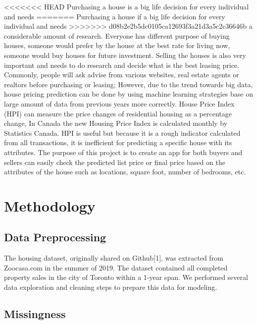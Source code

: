 \documentclass[11pt,]{article}
\begin{document}
<<<<<<< HEAD
Purchasing a house is a big life decision for every individual and needs
=======
Purchasing a house if a big life decision for every individual and needs
>>>>>>> d08b2e2b5dc0105ca12693f3a21d3a5c2c36646b
a considerable amount of research. Everyone has different purpose of
buying houses, someone would prefer by the house at the best rate for
living now, someone would buy houses for future investment. Selling the
houses is also very important and needs to do research and decide what
is the best leasing price. Commonly, people will ask advise from various
websites, real estate agents or realtors before purchasing or leasing;
However, due to the trend towards big data, house pricing prediction can
be done by using machine learning strategies base on large amount of
data from previous years more correctly. House Price Index (HPI) can
measure the price changes of residential housing as a percentage change,
In Canada the new Housing Price Index is calculated monthly by
Statistics Canada. HPI is useful but because it is a rough indicator
calculated from all transactions, it is inefficient for predicting a
specific house with its attributes. The purpose of this project is to
create an app for both buyers and sellers can easily check the predicted
list price or final price based on the attributes of the house such as
locations, square foot, number of bedrooms, etc.

\hypertarget{methodology}{%
\section{Methodology}\label{methodology}}

\hypertarget{data-preprocessing}{%
\subsection{Data Preprocessing}\label{data-preprocessing}}

The housing dataset, originally shared on Github{[}1{]}, was extracted
from Zoocasa.com in the summer of 2019. The dataset contained all
completed property sales in the city of Toronto within a 1-year span. We
performed several data exploration and cleaning steps to prepare this
data for modeling.

\hypertarget{missingness}{%
\subsection{Missingness}\label{missingness}}
\end{document}
